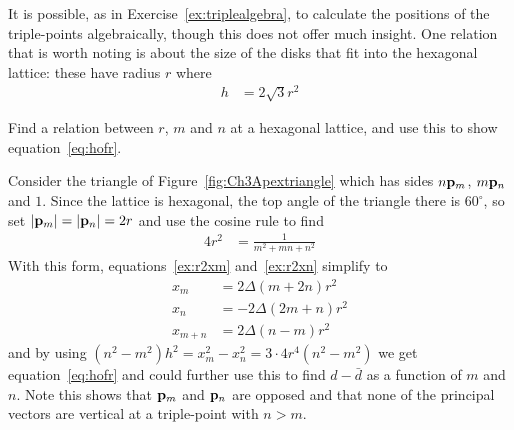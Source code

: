 It is possible, as in Exercise~\ref{ex:triplealgebra}, to calculate the positions of the triple-points algebraically, though this does not offer much insight.
One relation that is worth noting is about the size of the disks that fit into the hexagonal lattice: these 
have radius $r$ where
\begin{align}
	h &= 2\sqrt{3} r^2  \label{eq:hofr}
\end{align}
\begin{jExercise} 
	\label{ex:triplealgebra}
	Find a relation between $r$, $m$ and $n$ at a hexagonal lattice, and use this to show equation~\eqref{eq:hofr}.
\end{jExercise}
\begin{jAnswer}
Consider the triangle of Figure~\ref{fig:Ch3Apextriangle} which has sides $n{\mathbf p}_{m}$, $m{\mathbf p}_{n}$ and $1$. Since the lattice is hexagonal, the top angle of the triangle there is $60^\circ$, so set $|{\mathbf p}_{m}|=|{\mathbf p}_{n}|=2r$ and use the cosine rule to find   
\begin{align*}
	4 r^2  &=  \frac{1}{m^2+mn + n^2} \label{eq:cosine}
\end{align*}
With this form, equations~\eqref{ex:r2xm} and~\eqref{ex:r2xn} simplify to 
\begin{align*}
	x_m 
	&= 2\Delta(m+2n) r^2
	\\
	x_n &= -2 \Delta (2m+n) r^2
	\\
	x_{m+n} &=  2  \Delta(n-m) r^2
\end{align*}
and by using $(n^2-m^2)h^2=x^2_m-x^2_n=3\cdot 4 r^4 (n^2-m^2)$ we get equation~\eqref{eq:hofr} and could further use this to find $d-\bar{d}$ as a function of $m$ and $n$. Note this shows that ${\mathbf p}_{m}$ and ${\mathbf p}_{n}$ are opposed and that none of the principal vectors are vertical at a triple-point with $n>m$. 
\end{jAnswer} 






